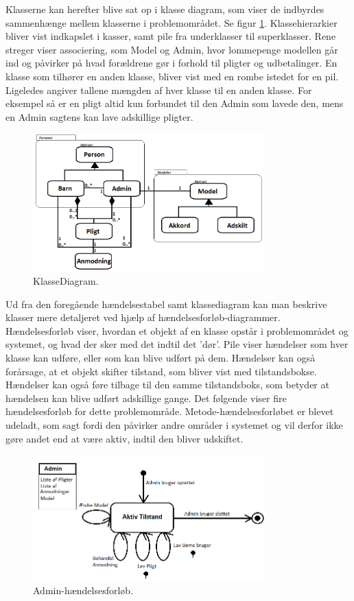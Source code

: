 Klasserne kan herefter blive sat op i klasse diagram, som viser de indbyrdes sammenhænge mellem klasserne i problemområdet. Se figur \ref{KlasseDiagram}. Klassehierarkier bliver vist indkapslet i kasser, samt pile fra underklasser til superklasser. Rene streger viser associering, som Model og Admin, hvor lommepenge modellen går ind og påvirker på hvad forældrene gør i forhold til pligter og udbetalinger. En klasse som tilhører en anden klasse, bliver vist med en rombe istedet for en pil. Ligeledes angiver tallene mængden af hver klasse til en anden klasse. For eksempel så er en pligt altid kun forbundet til den Admin som lavede den, mens en Admin sagtens kan lave adskillige pligter.

\begin{figure}[H]
\centering
\includegraphics[width=0.8\textwidth]{Billeder/KlasseDiagram.png}
\caption{KlasseDiagram.}
\label{KlasseDiagram}
\end{figure}

Ud fra den foregående hændelsestabel samt klassediagram kan man beskrive klasser mere detaljeret ved hjælp af hændelsesforløb-diagrammer. Hændelsesforløb viser, hvordan et objekt af en klasse opstår i problemområdet og systemet, og hvad der sker med det indtil det ’dør’. Pile viser hændelser som hver klasse kan udføre, eller som kan blive udført på dem. Hændelser kan også forårsage, at et objekt skifter tilstand, som bliver vist med tilstandsbokse. Hændelser kan også føre tilbage til den samme tilstandsboks, som betyder at hændelsen kan blive udført adskillige gange. Det følgende viser fire hændelsesforløb for dette problemområde. Metode-hændelsesforløbet er blevet udeladt, som sagt fordi den påvirker andre områder i systemet og vil derfor ikke gøre andet end at være aktiv, indtil den bliver udskiftet.

\begin{figure}[H]
\centering
\includegraphics[width=0.8\textwidth]{Billeder/ForaelderForloeb.png}
\caption{Admin-hændelsesforløb.}
\label{ForaelderHaendelsesforloeb}
\end{figure}

